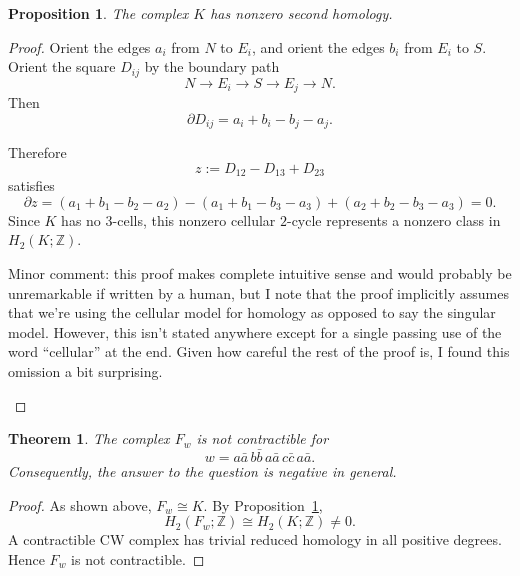 \documentclass[12pt]{article}
\newtheorem{theorem}{Theorem}
\newtheorem{proposition}{Proposition}
\newcommand{\review}[1]{\begin{reviewbox}#1\end{reviewbox}}
\begin{document}
\begin{proposition}\label{prop:h2}
The complex \(K\) has nonzero second homology.
\end{proposition}

\begin{proof}
Orient the edges \(a_i\) from \(N\) to \(E_i\), and orient the edges \(b_i\) from \(E_i\) to \(S\).  Orient the square \(D_{ij}\) by the boundary path
\[
N\longrightarrow E_i\longrightarrow S\longrightarrow E_j\longrightarrow N.
\]
Then
\[
\partial D_{ij}=a_i+b_i-b_j-a_j.
\]

Therefore
\[
z:=D_{12}-D_{13}+D_{23}
\]
satisfies
\[
\partial z
=
(a_1+b_1-b_2-a_2)
-(a_1+b_1-b_3-a_3)
+(a_2+b_2-b_3-a_3)
=0.
\]
Since \(K\) has no \(3\)-cells, this nonzero cellular \(2\)-cycle represents a nonzero class in \(H_2(K;\mathbb Z)\).
\review{Minor comment: this proof makes complete intuitive sense and would probably be unremarkable if written by a human, but I note that the proof implicitly assumes that we're using the cellular model for homology as opposed to say the singular model. However, this isn't stated anywhere except for a single passing use of the word ``cellular'' at the end. Given how careful the rest of the proof is, I found this omission a bit surprising.}
\end{proof}

\begin{theorem}
The complex \(F_w\) is not contractible for
\[
w=a\bar a\, b\bar b\, a\bar a\, c\bar c\, a\bar a.
\]
Consequently, the answer to the question is negative in general.
\end{theorem}

\begin{proof}
As shown above, \(F_w\cong K\).  By Proposition~\ref{prop:h2},
\[
H_2(F_w;\mathbb Z)\cong H_2(K;\mathbb Z)\neq 0.
\]
A contractible CW complex has trivial reduced homology in all positive degrees.  Hence \(F_w\) is not contractible.
\end{proof}
\end{document}
